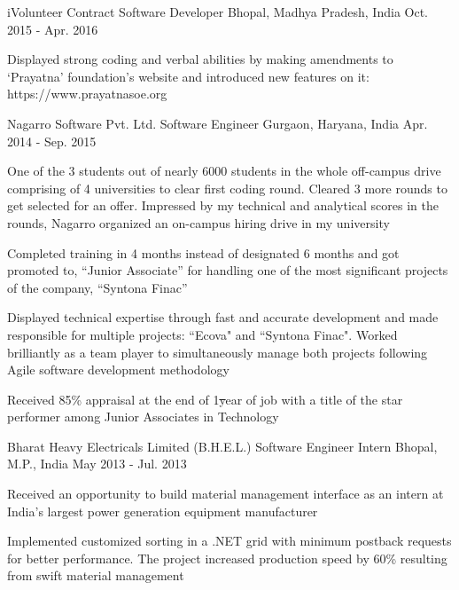 \begin{cventries}
	\cventry
		{iVolunteer}  	
  		{Contract Software Developer}
		{Bhopal, Madhya Pradesh, India}
		{Oct. 2015 - Apr. 2016}	
		{
			\begin{cvitems} 
				\item {Displayed strong coding and verbal abilities by making amendments to `Prayatna' foundation's  website and introduced new features on it: https://www.prayatnasoe.org}  \vspace*{0.05in}
			\end{cvitems}
		}
		


	\cventry
		{Nagarro Software Pvt. Ltd.}    
    	{Software Engineer} %
    	{Gurgaon, Haryana, India} %
    	{Apr. 2014 - Sep. 2015} %
    	{
      		\begin{cvitems} %
				\item {One of the 3 students out of nearly 6000 students in the whole off-campus drive comprising of 4 universities to clear first coding round. Cleared 3 more rounds to get selected for an offer. Impressed by my technical and analytical scores in the rounds, Nagarro organized an on-campus hiring drive in my university}
				\item {Completed training in 4 months instead of designated 6 months and got promoted to, “Junior Associate” for handling one of the most significant projects of the company, ``Syntona Finac”}        
        		\item {Displayed technical expertise through fast and  accurate development and made responsible for multiple projects: ``Ecova" and ``Syntona Finac". Worked brilliantly as a team player to simultaneously manage both projects following Agile software development methodology}
        		\item {Received 85\% appraisal at the end of 1\st year of job with a title of the star performer among Junior Associates in Technology}  \vspace*{0.05in}
      		\end{cvitems}
    	}



\cventry
		{Bharat Heavy Electricals Limited (B.H.E.L.)}    
    	{Software Engineer Intern} %
    	{Bhopal, M.P., India} %
    	{May 2013 - Jul. 2013} %
    	{
      		\begin{cvitems} %
				\item {Received an opportunity to build material management interface as an intern at India's largest power generation equipment manufacturer}
				\item {Implemented customized sorting in a .NET grid with minimum postback requests for better performance. The project increased production speed by 60\% resulting from swift material management 
}      %
      		\end{cvitems}
    	}
\end{cventries}
    	
    	
    	